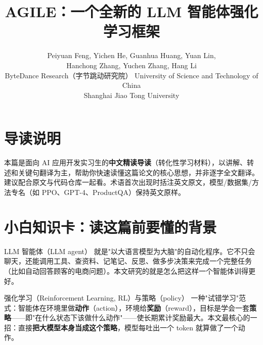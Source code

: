 \documentclass[11pt,UTF8,fontset=fandol]{ctexart}
\title{\textbf{AGILE：一个全新的 LLM 智能体强化学习框架}}
\author{Peiyuan Feng, Yichen He, Guanhua Huang, Yuan Lin,\\
Hanchong Zhang, Yuchen Zhang, Hang Li\\[2pt]
\normalsize ByteDance Research（字节跳动研究院）\quad
University of Science and Technology of China\\
\normalsize Shanghai Jiao Tong University}
\date{}
\begin{document}
\maketitle

\begin{center}
\end{center}

\vspace{0.5em}

\section*{导读说明}
本篇是面向 AI 应用开发实习生的\textbf{中文精读导读}（转化性学习材料），以讲解、转述和关键句翻译为主，帮助你快速读懂这篇论文的核心思想，并非逐字全文翻译。建议配合原文与代码仓库一起看。术语首次出现时括注英文原文，模型/数据集/方法专名（如 PPO、GPT-4、ProductQA）保持英文原样。

\section{小白知识卡：读这篇前要懂的背景}

\begin{infocard}{LLM 智能体（LLM agent）}
就是"以大语言模型为大脑"的自动化程序。它不只会聊天，还能调用工具、查资料、记笔记、反思、做多步决策来完成一个完整任务（比如自动回答顾客的电商问题）。本文研究的就是怎么把这样一个智能体训得更好。
\end{infocard}

\begin{infocard}{强化学习（Reinforcement Learning, RL）与策略（policy）}
一种"试错学习"范式：智能体在环境里做\textbf{动作}（action），环境给\textbf{奖励}（reward），目标是学会一套\textbf{策略}——即"在什么状态下该做什么动作"——使长期累计奖励最大。本文最核心的一招：直接\textbf{把大模型本身当成这个策略}，模型每吐出一个 token 就算做了一个动作。
\end{infocard}
\end{document}
